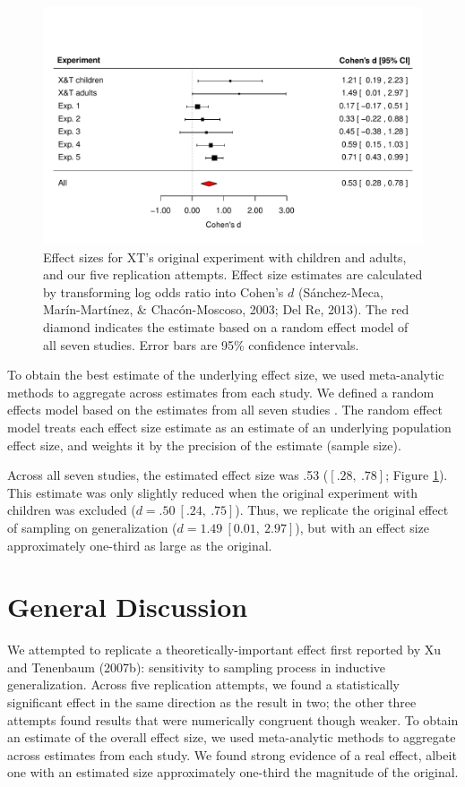 \documentclass[man]{apa2}
\begin{document}
\begin{figure}[t]
  \centering
  \includegraphics[width=6in]{figures/FIG_3.pdf} 
  \caption{\label{fig:effect_sizes} Effect sizes for XT's original experiment with children and adults, and our five replication attempts. Effect size estimates are calculated  by transforming log odds ratio into Cohen's $d$ (S\'{a}nchez-Meca, Mar\'{i}n-Mart\'{i}nez, \& Chac\'{o}n-Moscoso, 2003; Del Re, 2013). The red diamond indicates the estimate based on a random effect model of all seven studies. Error bars are 95\% confidence intervals.} 
\end{figure}

To obtain the best estimate of the underlying effect size, we used meta-analytic methods to aggregate across estimates from each study. We defined a random effects model  based on the estimates from all seven studies \cite{Viechtbauer2010}. The random effect model treats each effect size estimate as an estimate of an underlying population effect size, and weights it by the precision of the estimate (sample size). 

Across all seven studies, the estimated effect size was .53 ($[.28,\ .78]$; Figure \ref{fig:effect_sizes}). This estimate was only slightly reduced when the original experiment with children was excluded  ($d = .50\ [.24,\ .75]$). Thus, we replicate the original effect of sampling on generalization ($d = 1.49\ [0.01,\ 2.97]$), but with an effect size approximately one-third as large as the original.

\section{General Discussion}

We attempted to replicate a theoretically-important effect first reported by Xu and Tenenbaum (2007b): sensitivity to sampling process in inductive generalization. Across five replication attempts, we found a statistically significant effect in the same direction as the result in two; the other three attempts found results that were numerically congruent though weaker. To obtain an estimate of the overall effect size, we used meta-analytic methods to aggregate across estimates from each study. We found strong evidence of a real effect, albeit one with an estimated size approximately one-third the magnitude of the original. 
\end{document}
